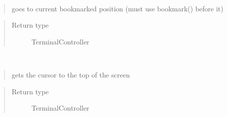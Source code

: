 \documentclass[a4paper,10pt,english]{sphinxmanual}
\begin{document}
\begin{fulllineitems}
\begin{fulllineitems}
\begin{quote}
\begin{description}
\end{description}\end{quote}

\end{fulllineitems}


\begin{fulllineitems}
\label{\detokenize{api/termtools.terminal.TerminalController:termtools.terminal.TerminalController.goto_bookmark}}~\begin{quote}

goes to current bookmarked position (must use bookmark() before it)
\end{quote}
\begin{quote}\begin{description}
\item[{Return type}] \leavevmode
TerminalController

\end{description}\end{quote}

\end{fulllineitems}


\begin{fulllineitems}
\label{\detokenize{api/termtools.terminal.TerminalController:termtools.terminal.TerminalController.home}}~\begin{quote}

gets the cursor to the top of the screen
\end{quote}
\begin{quote}\begin{description}
\item[{Return type}] \leavevmode
TerminalController

\end{description}\end{quote}

\end{fulllineitems}


\begin{fulllineitems}
\label{\detokenize{api/termtools.terminal.TerminalController:termtools.terminal.TerminalController.left}}~\begin{quote}


\end{quote}
\end{fulllineitems}
\end{fulllineitems}
\end{document}
